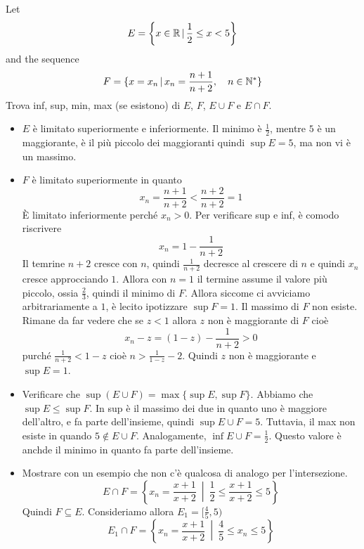 \documentclass[a4paper]{article}
\begin{document}
\begin{snippetexercise}{}
    Let
    \[
        E = \left\{ x\in\mathbb{R} \,|\, \frac{1}{2} \leq x < 5 \right\}
    \]
    and the sequence \[
        F = \{ x = x_n \,|\, x_n = \frac{n + 1}{n + 2}, \quad n\in\mathbb{N}^* \}
    \]
    Trova inf, sup, min, max (se esistono) di \(E\), \(F\), \(E \cup F\) e \(E\cap F\).
    \begin{itemize}
        \item \(E\) è limitato superiormente e inferiormente.
        Il minimo è \(\frac{1}{2}\), mentre \(5\) è un maggiorante, è il più piccolo
        dei maggioranti quindi \(\sup E = 5\), ma non vi è un massimo.
        \item \(F\) è limitato superiormente in quanto 
        \[
            x_n = \frac{n+1}{n+2} < \frac{n+2}{n+2}  =1
        \]
        È limitato inferiormente perché \(x_n > 0\).
        Per verificare sup e inf, è comodo riscrivere \[
            x_n = 1 - \frac{1}{n+2}
        \]
        Il temrine \(n+2\) cresce con \(n\), quindi \(\frac{1}{n+2}\) decresce al crescere di \(n\)
        e quindi \(x_n\) cresce approcciando \(1\). Allora con \(n=1\) il termine assume il valore più piccolo,
        ossia \(\frac{2}{3}\), quindi il minimo di \(F\). Allora siccome ci avviciamo arbitrariamente a
        \(1\), è lecito ipotizzare \(\sup F = 1\).
        Il massimo di \(F\) non esiste.
        Rimane da far vedere che se \(z < 1\) allora \(z\) non è maggiorante di \(F\)
        cioè
        \[
            x_n - z = (1-z) - \frac{1}{n+2} > 0
        \]
        purché \(\frac{1}{n+2} < 1-z\) cioè \(n > \frac{1}{1-z}-2\).
        Quindi \(z\) non è maggiorante e \(\sup E = 1\).
        \item Verificare che \(\sup (E \cup F) = \max \{ \sup E,\sup F \}\).
        Abbiamo che \(\sup E \leq \sup F\).
        In sup è il massimo dei due in quanto uno è maggiore dell'altro,
        e fa parte dell'insieme, quindi \(\sup E \cup F = 5\).
        Tuttavia, il max non esiste in quando \(5\notin  E \cup F\).
        Analogamente, \(\inf E \cup F = \frac{1}{2}\). Questo valore è anchde il minimo
        in quanto fa parte dell'insieme.
        \item Mostrare con un esempio che non c'è qualcosa di analogo per l'intersezione.
        \[
            E \cap F = \left\{ x_n = \frac{x+1}{x+2} \ \middle|\ \frac{1}{2} \leq \frac{x+1}{x+2} \leq 5 \right\}
        \]
        Quindi \(F \subseteq E\). Consideriamo allora \(E_1 = [\frac{4}{5}, 5)\)
        \[
            E_1 \cap F = \left\{ x_n = \frac{x+1}{x+2} \ \middle|\ \frac{4}{5} \leq x_n \leq 5 \right\}
\]
\end{itemize}
\end{snippetexercise}
\end{document}
